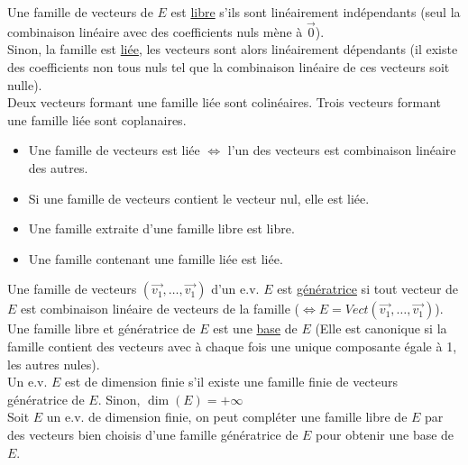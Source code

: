   Une famille de vecteurs de $E$ est \underline{libre} s'ils sont linéairement indépendants (seul la combinaison linéaire avec des coefficients nuls mène à $\vec 0$).\\
  
  Sinon, la famille est \underline{liée}, les vecteurs sont alors linéairement dépendants (il existe des coefficients non tous nuls tel que la combinaison linéaire de ces vecteurs soit nulle).\\
  
  Deux vecteurs formant une famille liée sont colinéaires.
  Trois vecteurs formant une famille liée sont coplanaires.\\
  
  \begin{itemize}
    \item Une famille de vecteurs est liée $\iff$ l'un des vecteurs est combinaison linéaire des autres.
    \item Si une famille de vecteurs contient le vecteur nul, elle est liée.
    \item Une famille extraite d'une famille libre est libre.
    \item Une famille contenant une famille liée est liée.\\
  \end{itemize}
  
  Une famille de vecteurs $(\vec{v_1}, \dots, \vec{v_1})$ d'un e.v. $E$ est \underline{génératrice} si tout vecteur de $E$ est combinaison linéaire de vecteurs de la famille ($\iff E = Vect(\vec{v_1}, \dots, \vec{v_1})$).\\
  Une famille libre et génératrice de $E$ est une \underline{base} de $E$ (Elle est canonique si la famille contient des vecteurs avec à chaque fois une unique composante égale à 1, les autres nules).\\
  
  Un e.v. $E$ est de dimension finie s'il existe une famille finie de vecteurs génératrice de $E$.
  Sinon, $\dim(E) = +\infty$\\
  
  Soit $E$ un e.v. de dimension finie, on peut compléter une famille libre de $E$ par des vecteurs bien choisis d'une famille génératrice de $E$ pour obtenir une base de $E$.
  